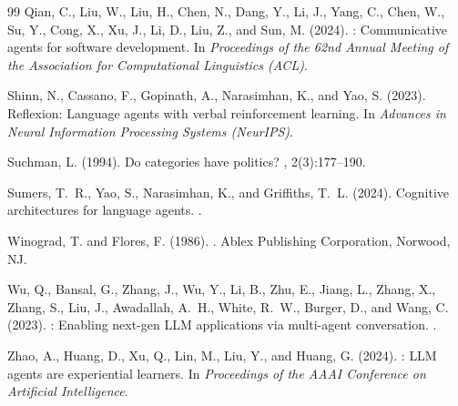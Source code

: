 \documentclass[11pt,a4paper]{article}
\begin{document}
\begin{thebibliography}{99}
Qian, C., Liu, W., Liu, H., Chen, N., Dang, Y., Li, J., Yang, C.,
Chen, W., Su, Y., Cong, X., Xu, J., Li, D., Liu, Z., and Sun, M. (2024).
: Communicative agents for software development.
\newblock In {\em Proceedings of the 62nd Annual Meeting of the Association
for Computational Linguistics (ACL)}.

Shinn, N., Cassano, F., Gopinath, A., Narasimhan, K., and Yao, S. (2023).
\newblock Reflexion: Language agents with verbal reinforcement learning.
\newblock In {\em Advances in Neural Information Processing Systems
(NeurIPS)}.

Suchman, L. (1994).
\newblock Do categories have politics?
, 2(3):177--190.

Sumers, T.~R., Yao, S., Narasimhan, K., and Griffiths, T.~L. (2024).
\newblock Cognitive architectures for language agents.
.

Winograd, T. and Flores, F. (1986).
.
\newblock Ablex Publishing Corporation, Norwood, NJ.

Wu, Q., Bansal, G., Zhang, J., Wu, Y., Li, B., Zhu, E., Jiang, L.,
Zhang, X., Zhang, S., Liu, J., Awadallah, A.~H., White, R.~W.,
Burger, D., and Wang, C. (2023).
: Enabling next-gen {LLM} applications via multi-agent
conversation.
.

Zhao, A., Huang, D., Xu, Q., Lin, M., Liu, Y., and Huang, G. (2024).
: {LLM} agents are experiential learners.
\newblock In {\em Proceedings of the AAAI Conference on Artificial
Intelligence}.

\end{thebibliography}
\end{document}
